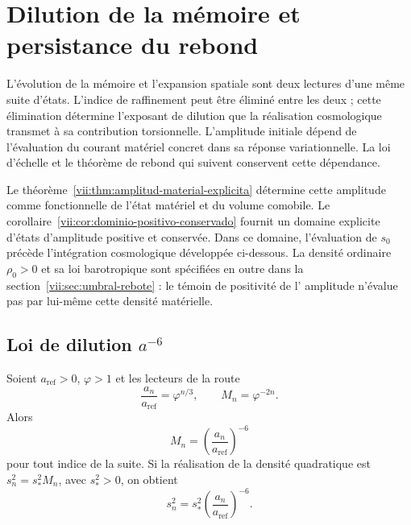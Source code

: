 
\section{Dilution de la mémoire et persistance du rebond}
\label{vii:sec:dilucion-rebote}

L'évolution de la mémoire et l'expansion spatiale sont deux lectures d'une même suite d'états. L'indice de raffinement peut être éliminé entre les deux ; cette élimination détermine l'exposant de dilution que la réalisation cosmologique transmet à sa contribution torsionnelle. L'amplitude initiale dépend de l'évaluation du courant matériel concret dans sa réponse variationnelle. La loi d'échelle et le théorème de rebond qui suivent conservent cette dépendance.

Le théorème~\ref{vii:thm:amplitud-material-explicita} détermine cette
amplitude comme fonctionnelle de l'état matériel et du volume comobile.
Le corollaire~\ref{vii:cor:dominio-positivo-conservado} fournit
un domaine explicite d'états d'amplitude positive et conservée.
Dans ce domaine, l'évaluation de \(s_0\) précède l'intégration
cosmologique développée ci-dessous. La densité ordinaire
\(\rho_0>0\) et sa loi barotropique sont spécifiées en outre dans la
section~\ref{vii:sec:umbral-rebote} : le témoin de positivité de l'
amplitude n'évalue pas par lui-même cette densité matérielle.

\subsection{Loi de dilution \texorpdfstring{\(a^{-6}\)}{a élevé à -6}}
\label{vii:sec:dilucion}

\begin{proposition}
\label{vii:prop:dilucion}
Soient \(a_{\mathrm{ref}}>0\), \(\varphi>1\) et les lecteurs de la route
\[
 \frac{a_n}{a_{\mathrm{ref}}}=\varphi^{n/3},\qquad
 M_n=\varphi^{-2n}.
\]
Alors
\[
 M_n=\left(\frac{a_n}{a_{\mathrm{ref}}}\right)^{-6}
\]
pour tout indice de la suite. Si la réalisation de la densité
quadratique est \(s_n^2=s_*^2M_n\), avec \(s_*^2>0\), on obtient
\[
 s_n^2=s_*^2\left(\frac{a_n}{a_{\mathrm{ref}}}\right)^{-6}.
\]
\end{proposition}

